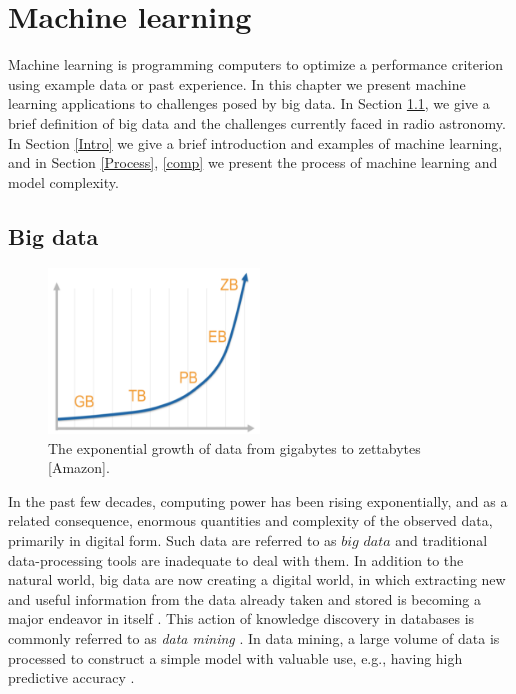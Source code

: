 
\chapter{Machine learning}
Machine learning is programming computers to optimize a performance
criterion using example data or past experience. In this chapter we present machine learning applications to challenges posed by big data. In Section \ref{BigD}, we give a brief definition of big data  and the challenges currently faced in radio astronomy. In Section \ref{Intro} we give a brief introduction and examples of machine learning,  and in Section \ref{Process}, \ref{comp} we  present the process of machine learning and model complexity.
\section{Big data}
\label{BigD}
\begin{figure}[H]
  \centering
    \includegraphics[width=0.5\textwidth]{images/Expgrowth.png}
    \caption{The exponential growth of data from gigabytes to zettabytes [Amazon].}
  \label{datagrowth.png}
\end{figure}

In the past few decades, computing power has been rising exponentially, 
and as a related consequence, enormous quantities and complexity of the observed data, primarily in digital form. Such data are referred to as $\textit{big data}$ and traditional data-processing tools are inadequate to deal with them. In addition to the natural world, big data are now creating a digital world, in which extracting new and useful information from the data already taken and stored is becoming a major endeavor in itself \citep{ball2010data}. This action of knowledge discovery in databases is commonly referred to as \textit{data mining} \citep{ball2010data}. In data mining, a large volume
of data is processed to construct a simple model with valuable use, e.g., having high predictive accuracy  \citep{alpaydin2014introduction}.



